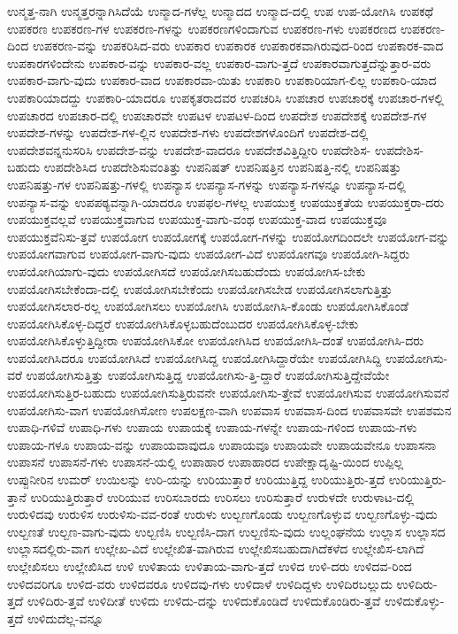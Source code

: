 {ಉನ್ಮತ್ತ-ನಾಗಿ
ಉನ್ಮತ್ತರನ್ನಾಗಿಸಿದೆಯೆ
ಉನ್ಮಾದ-ಗಳೆಲ್ಲ
ಉನ್ಮಾದದ
ಉನ್ಮಾದ-ದಲ್ಲಿ
ಉಪ
ಉಪ-ಯೋಗಿಸಿ
ಉಪಕಥೆ
ಉಪಕರಣ
ಉಪಕರಣ-ಗಳ
ಉಪಕರಣ-ಗಳನ್ನು
ಉಪಕರಣಗಳಿಂದಾಗುವ
ಉಪಕರಣ-ಗಳು
ಉಪಕರಣದ
ಉಪಕರಣ-ದಿಂದ
ಉಪಕರಣ-ವನ್ನು
ಉಪಕರಿಸಿದ-ವರು
ಉಪಕಾರ
ಉಪಕಾರಕ
ಉಪಕಾರಕವಾಗಿರುವುದ-ರಿಂದ
ಉಪಕಾರಕ-ವಾದ
ಉಪಕಾರಗಳಿಂದೇನು
ಉಪಕಾರ-ವನ್ನು
ಉಪಕಾರ-ವಲ್ಲ
ಉಪಕಾರ-ವಾಗು-ತ್ತದೆ
ಉಪಕಾರವಾಗುತ್ತದೆನ್ನುತ್ತಾರ-ವರು
ಉಪಕಾರ-ವಾಗು-ವುದು
ಉಪಕಾರ-ವಾದ
ಉಪಕಾರವಾ-ಯಿತು
ಉಪಕಾರಿ
ಉಪಕಾರಿಯಾಗ-ಲಿಲ್ಲ
ಉಪಕಾರಿ-ಯಾದ
ಉಪಕಾರಿಯಾದದ್ದು
ಉಪಕಾರಿ-ಯಾದರೂ
ಉಪಕೃತರಾದವರ
ಉಪಚರಿಸಿ
ಉಪಚಾರ
ಉಪಚಾರಕ್ಕೆ
ಉಪಚಾರ-ಗಳಲ್ಲಿ
ಉಪಚಾರದ
ಉಪಚಾರ-ದಲ್ಲಿ
ಉಪಚಾರವೇ
ಉಪಟಳ
ಉಪಟಳ-ದಿಂದ
ಉಪದೇಶ
ಉಪದೇಶಕ್ಕೆ
ಉಪದೇಶ-ಗಳ
ಉಪದೇಶ-ಗಳನ್ನು
ಉಪದೇಶ-ಗಳ-ಲ್ಲಿನ
ಉಪದೇಶ-ಗಳು
ಉಪದೇಶಗಳೊಂದಿಗೆ
ಉಪದೇಶ-ದಲ್ಲಿ
ಉಪದೇಶವನ್ನನುಸರಿಸಿ
ಉಪದೇಶ-ವನ್ನು
ಉಪದೇಶ-ವಾದರೂ
ಉಪದೇಶವಿತ್ತಿದ್ದೀರಿ
ಉಪದೇಶಿಸ-
ಉಪದೇಶಿಸ-ಬಹುದು
ಉಪದೇಶಿಸಿದ
ಉಪದೇಶಿಸುವಂತಿತ್ತು
ಉಪನಿಷತ್
ಉಪನಿಷತ್ತಿನ
ಉಪನಿಷತ್ತಿ-ನಲ್ಲಿ
ಉಪನಿಷತ್ತು
ಉಪನಿಷತ್ತು-ಗಳ
ಉಪನಿಷತ್ತು-ಗಳಲ್ಲಿ
ಉಪನ್ಯಾಸ
ಉಪನ್ಯಾಸ-ಗಳನ್ನು
ಉಪನ್ಯಾಸ-ಗಳನ್ನೂ
ಉಪನ್ಯಾಸ-ದಲ್ಲಿ
ಉಪನ್ಯಾಸ-ವನ್ನು
ಉಪಪಠ್ಯವನ್ನಾಗಿ-ಯಾದರೂ
ಉಪಫಲ-ಗಳಲ್ಲ
ಉಪಯುಕ್ತ
ಉಪಯುಕ್ತತೆಯ
ಉಪಯುಕ್ತರಾ-ದರು
ಉಪಯುಕ್ತವಲ್ಲವೆ
ಉಪಯುಕ್ತವಾಗುವ
ಉಪಯುಕ್ತ-ವಾಗು-ವಂಥ
ಉಪಯುಕ್ತ-ವಾದ
ಉಪಯುಕ್ತವೂ
ಉಪಯುಕ್ತವೆನಿಸು-ತ್ತವೆ
ಉಪಯೋಗ
ಉಪಯೋಗಕ್ಕೆ
ಉಪಯೋಗ-ಗಳನ್ನು
ಉಪಯೋಗದಿಂದಲೇ
ಉಪಯೋಗ-ವನ್ನು
ಉಪಯೋಗವಾಗುವ
ಉಪಯೋಗ-ವಾಗು-ವುದು
ಉಪಯೋಗ-ವಿದೆ
ಉಪಯೋಗವೂ
ಉಪಯೋಗಿ-ಸಿದ್ದರು
ಉಪಯೋಗಿಯಾಗು-ವುದು
ಉಪಯೋಗಿಸದೆ
ಉಪಯೋಗಿಸಬಹುದೆಂದು
ಉಪಯೋಗಿಸ-ಬೇಕು
ಉಪಯೋಗಿಸಬೇಕೆಂದಾ-ದಲ್ಲಿ
ಉಪಯೋಗಿಸಬೇಕೆಂದು
ಉಪಯೋಗಿಸಬೇಡ
ಉಪಯೋಗಿಸಲಾಗುತ್ತಿತ್ತು
ಉಪಯೋಗಿಸಲಾರ-ರಲ್ಲ
ಉಪಯೋಗಿಸಲು
ಉಪಯೋಗಿಸಿ
ಉಪಯೋಗಿಸಿ-ಕೊಂಡು
ಉಪಯೋಗಿಸಿಕೊಂಡೆ
ಉಪಯೋಗಿಸಿಕೊಳ್ಳ-ದಿದ್ದರೆ
ಉಪಯೋಗಿಸಿಕೊಳ್ಳಬಹುದೆಂಬುದರ
ಉಪಯೋಗಿಸಿಕೊಳ್ಳ-ಬೇಕು
ಉಪಯೋಗಿಸಿಕೊಳ್ಳುತ್ತಿದ್ದೀರಾ
ಉಪಯೋಗಿಸಿಕೋ
ಉಪಯೋಗಿಸಿದ
ಉಪಯೋಗಿಸಿ-ದಂತೆ
ಉಪಯೋಗಿಸಿ-ದರು
ಉಪಯೋಗಿಸಿದರೂ
ಉಪಯೋಗಿಸಿದೆ
ಉಪಯೋಗಿಸಿದ್ದ
ಉಪಯೋಗಿಸಿದ್ದಾರೆಯೇ
ಉಪಯೋಗಿಸಿದ್ದಿ
ಉಪಯೋಗಿಸು-ವರೆ
ಉಪಯೋಗಿಸುತ್ತಿತ್ತು
ಉಪಯೋಗಿಸುತ್ತಿದ್ದ
ಉಪಯೋಗಿಸು-ತ್ತಿ-ದ್ದಾರೆ
ಉಪಯೋಗಿಸುತ್ತಿದ್ದೇವೆಯೇ
ಉಪಯೋಗಿಸುತ್ತಿರ-ಬಹುದು
ಉಪಯೋಗಿಸುತ್ತಿರುವನೇ
ಉಪಯೋಗಿಸು-ತ್ತೇವೆ
ಉಪಯೋಗಿಸುವ
ಉಪಯೋಗಿಸುವನೆ
ಉಪಯೋಗಿಸು-ವಾಗ
ಉಪಯೋಗಿಸೋಣ
ಉಪಲಕ್ಷಣ-ವಾಗಿ
ಉಪವಾಸ
ಉಪವಾಸ-ದಿಂದ
ಉಪವಾಸವೇ
ಉಪಶಮನ
ಉಪಾಧಿ-ಗಳಿವೆ
ಉಪಾಧಿ-ಗಳು
ಉಪಾಯ
ಉಪಾಯಕ್ಕೆ
ಉಪಾಯ-ಗಳನ್ನೇ
ಉಪಾಯ-ಗಳಿಂದ
ಉಪಾಯ-ಗಳು
ಉಪಾಯ-ಗಳೂ
ಉಪಾಯ-ವನ್ನು
ಉಪಾಯವಾವುದೂ
ಉಪಾಯವೂ
ಉಪಾಯವೇ
ಉಪಾಯವೇನೂ
ಉಪಾಸನಾ
ಉಪಾಸನೆ
ಉಪಾಸನೆ-ಗಳು
ಉಪಾಸನೆ-ಯಲ್ಲಿ
ಉಪಾಹಾರ
ಉಪಾಹಾರದ
ಉಪೇಕ್ಷಾದೃಷ್ಟಿ-ಯಿಂದ
ಉಪ್ಪಿಲ್ಲ
ಉಪ್ಪುನೀರಿನ
ಉಮರ್
ಉಯಿಲನ್ನು
ಉರಿ-ಯನ್ನು
ಉರಿಯುತ್ತಾರೆ
ಉರಿಯುತ್ತಿದ್ದ
ಉರಿಯುತ್ತಿರು-ತ್ತದೆ
ಉರಿಯುತ್ತಿರು-ತ್ತಾನೆ
ಉರಿಯುತ್ತಿರುತ್ತಾರೆ
ಉರಿಯುವ
ಉರಿಸಬಾರದು
ಉರಿಸಲು
ಉರಿಸುತ್ತಾರೆ
ಉರುಳದೇ
ಉರುಳಾಟ-ದಲ್ಲಿ
ಉರುಳಿದವು
ಉರುಳಿಸ
ಉರುಳಿಸು-ವವ-ರಂತೆ
ಉರುಳು
ಉಲ್ಬಣಗೊಂಡು
ಉಲ್ಬಣಗೊಳ್ಳುವ
ಉಲ್ಬಣಗೊಳ್ಳು-ವುದು
ಉಲ್ಬಣತೆ
ಉಲ್ಬಣ-ವಾಗು-ವುದು
ಉಲ್ಬಣಿಸಿ
ಉಲ್ಬಣಿಸಿ-ದಾಗ
ಉಲ್ಬಣಿಸು-ವುದು
ಉಲ್ಲಂಘನೆಯ
ಉಲ್ಲಾಸ
ಉಲ್ಲಾಸದ
ಉಲ್ಲಾಸದಲ್ಲಿರು-ವಾಗ
ಉಲ್ಲೇಖ-ವಿದೆ
ಉಲ್ಲೇಖಿತ-ವಾಗಿರುವ
ಉಲ್ಲೇಖಿಸಬಹುದಾಗಿದೆಕಳೆದ
ಉಲ್ಲೇಖಿಸ-ಲಾಗಿದೆ
ಉಲ್ಲೇಖಿಸಲು
ಉಲ್ಲೇಖಿಸಿದ
ಉಳಿ
ಉಳಿತಾಯ
ಉಳಿತಾಯ-ವಾಗು-ತ್ತದೆ
ಉಳಿದ
ಉಳಿ-ದರು
ಉಳಿದವ-ರಿಂದ
ಉಳಿದವರಿಗೂ
ಉಳಿದ-ವರು
ಉಳಿದವರೂ
ಉಳಿದವು-ಗಳು
ಉಳಿದಾಳೆ
ಉಳಿದಿದ್ದಳು
ಉಳಿದಿರಬಲ್ಲುದು
ಉಳಿದಿರು-ತ್ತದೆ
ಉಳಿದಿರು-ತ್ತವೆ
ಉಳಿದೀತೆ
ಉಳಿದು
ಉಳಿದು-ದನ್ನು
ಉಳಿದುಕೊಂಡಿದೆ
ಉಳಿದುಕೊಂಡಿರು-ತ್ತವೆ
ಉಳಿದುಕೊಳ್ಳು-ತ್ತದೆ
ಉಳಿದುದೆಲ್ಲ-ವನ್ನೂ
}
